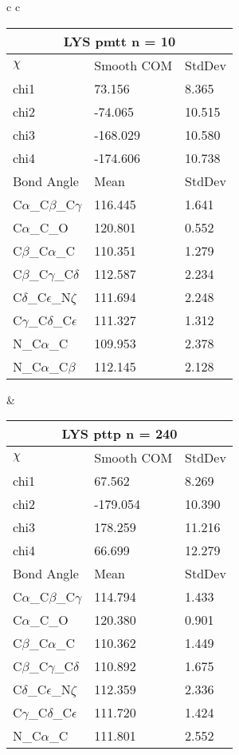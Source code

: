 \begin{longtable}{ c c }
\begin{tabular}{ l l l }
  \toprule
  \multicolumn{3}{c}{LYS \textbf{pmtt} n = 10} \\ \toprule
  $\chi$       & Smooth COM & StdDev \\ \midrule
  chi1 & 73.156 & 8.365 \\ 
  chi2 & -74.065 & 10.515 \\ 
  chi3 & -168.029 & 10.580 \\ 
  chi4 & -174.606 & 10.738 \\ \midrule
  Bond Angle   & Mean     & StdDev \\ \midrule
  C$\alpha$\_C$\beta$\_C$\gamma$ & 116.445 & 1.641\\
  C$\alpha$\_C\_O & 120.801 & 0.552\\
  C$\beta$\_C$\alpha$\_C & 110.351 & 1.279\\
  C$\beta$\_C$\gamma$\_C$\delta$ & 112.587 & 2.234\\
  C$\delta$\_C$\epsilon$\_N$\zeta$ & 111.694 & 2.248\\
  C$\gamma$\_C$\delta$\_C$\epsilon$ & 111.327 & 1.312\\
  N\_C$\alpha$\_C & 109.953 & 2.378\\
  N\_C$\alpha$\_C$\beta$ & 112.145 & 2.128\\
  \bottomrule
  \end{tabular}
  &
  \begin{tabular}{ l l l }
  \toprule
  \multicolumn{3}{c}{LYS \textbf{pttp} n = 240} \\ \toprule
  $\chi$       & Smooth COM & StdDev \\ \midrule
  chi1 & 67.562 & 8.269 \\ 
  chi2 & -179.054 & 10.390 \\ 
  chi3 & 178.259 & 11.216 \\ 
  chi4 & 66.699 & 12.279 \\ \midrule
  Bond Angle   & Mean     & StdDev \\ \midrule
  C$\alpha$\_C$\beta$\_C$\gamma$ & 114.794 & 1.433\\
  C$\alpha$\_C\_O & 120.380 & 0.901\\
  C$\beta$\_C$\alpha$\_C & 110.362 & 1.449\\
  C$\beta$\_C$\gamma$\_C$\delta$ & 110.892 & 1.675\\
  C$\delta$\_C$\epsilon$\_N$\zeta$ & 112.359 & 2.336\\
  C$\gamma$\_C$\delta$\_C$\epsilon$ & 111.720 & 1.424\\
  N\_C$\alpha$\_C & 111.801 & 2.552\\

\end{tabular}
\end{longtable}
